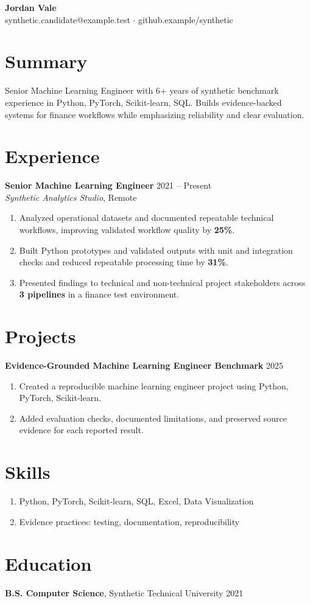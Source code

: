 \documentclass[10pt,letterpaper]{article}
\begin{document}
\begin{center}
{\Large \textbf{Jordan Vale}}\\
synthetic.candidate@example.test $\cdot$ github.example/synthetic
\end{center}

\section*{Summary}
Senior Machine Learning Engineer with 6+ years of synthetic benchmark experience in Python, PyTorch, Scikit-learn, SQL. Builds evidence-backed systems for finance workflows while emphasizing reliability and clear evaluation.

\section*{Experience}
\textbf{Senior Machine Learning Engineer} \hfill 2021 -- Present\\
\textit{Synthetic Analytics Studio}, Remote
\begin{enumerate}
  \item Analyzed operational datasets and documented repeatable technical workflows, improving validated workflow quality by \textbf{25\%}.
  \item Built Python prototypes and validated outputs with unit and integration checks and reduced repeatable processing time by \textbf{31\%}.
  \item Presented findings to technical and non-technical project stakeholders across \textbf{3 pipelines} in a finance test environment.
\end{enumerate}

\section*{Projects}
\textbf{Evidence-Grounded Machine Learning Engineer Benchmark} \hfill 2025
\begin{enumerate}
  \item Created a reproducible machine learning engineer project using Python, PyTorch, Scikit-learn.
  \item Added evaluation checks, documented limitations, and preserved source evidence for each reported result.
\end{enumerate}

\section*{Skills}
\begin{enumerate}
  \item Python, PyTorch, Scikit-learn, SQL, Excel, Data Visualization
  \item Evidence practices: testing, documentation, reproducibility
\end{enumerate}

\section*{Education}
\textbf{B.S. Computer Science}, Synthetic Technical University \hfill 2021
\end{document}
